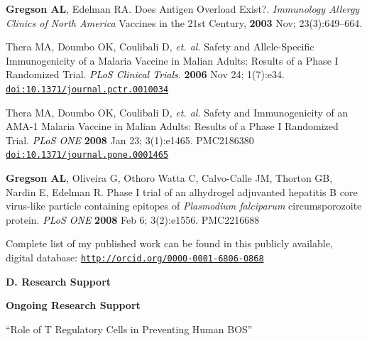 \documentclass[11pt]{nih-blank}%
\numberwithin{equation}{subsection}
\numberwithin{figure}{subsection}
\numberwithin{table}{subsection}
\begin{document}
\vspace{-10mm}
\renewcommand{\refname}{\normalsize{}\label{gregsonbs}}
\begin{thebibliography}{4}

 \bibitem[1]{} \textbf{Gregson AL}, Edelman RA. Does Antigen Overload Exist?. \textit{Immunology Allergy Clinics of North America} Vaccines in the 21st Century, \textbf{2003} Nov; 23(3):649--664. 

 \bibitem[2]{} Thera MA, Doumbo OK, Coulibali D, \emph{et. al.} Safety and Allele-Specific Immunogenicity of a Malaria Vaccine in Malian Adults: Results of a Phase I Randomized Trial.  \textcolor{Black}{\textit{PLoS Clinical Trials}}.  \textbf{2006} Nov 24; 1(7):e34. \href{http://dx.doi.org/10.1371/journal.pctr.0010034}{\nolinkurl{doi:10.1371/journal.pctr.0010034}}~ 

 \bibitem[3]{} Thera MA, Doumbo OK, Coulibali D, \emph{et. al.} Safety and Immunogenicity of an AMA-1 Malaria Vaccine in Malian Adults: Results of a Phase I Randomized Trial. \textcolor{Black}{\textit{PLoS {\smaller ONE}}} \textbf{2008} Jan 23; 3(1):e1465. PMC2186380 \href{http://dx.doi.org/10.1371/journal.pone.0001465}{\nolinkurl{doi:10.1371/journal.pone.0001465}}~ 

 \bibitem[4]{} \textbf{Gregson AL}, Oliveira G, Othoro Watta C, Calvo-Calle JM, Thorton GB, Nardin E, Edelman R. Phase I trial of an alhydrogel adjuvanted hepatitis B core virus-like particle containing epitopes of \emph{Plasmodium falciparum} circumsporozoite protein. \textcolor{Black}{\textit{PLoS {\smaller ONE}}}  \textbf{2008} Feb 6; 3(2):e1556. PMC2216688


\end{thebibliography}


Complete list of my published work can be found in this publicly available, digital database: \href{http://orcid.org/0000-0001-6806-0868}{\nolinkurl{http://orcid.org/0000-0001-6806-0868}}

\vskip 3mm

\noindent\textbf{D. Research Support}
\smallskip \par \noindent

\textbf{Ongoing Research Support}

\begin{parcolumns}[colwidths={1=5in,2=2in}]{2}

\end{parcolumns}
``Role of T Regulatory Cells in Preventing Human {\smaller BOS}''
\end{document}
